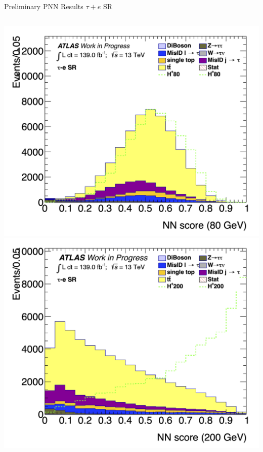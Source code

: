 \documentclass[aspectratio=169,xcolor=table]{beamer}
\begin{document}
    \begin{frame}[t]{Preliminary PNN Results $\tau+e$ SR}
      \begin{columns}[t]
        \includegraphics[height=.43\textheight,keepaspectratio=true]{Scores/taulep/myOutDirClfEval_1p_noUpsilon_test_full/clf_score_GB200_mass_80to80_SR_TAUEL.png}
        \includegraphics[height=.43\textheight,keepaspectratio=true]{Scores/taulep/myOutDirClfEval_1p_noUpsilon_test_full/clf_score_GB200_mass_200to200_SR_TAUEL.png}


\end{columns}
\end{frame}
\end{document}
